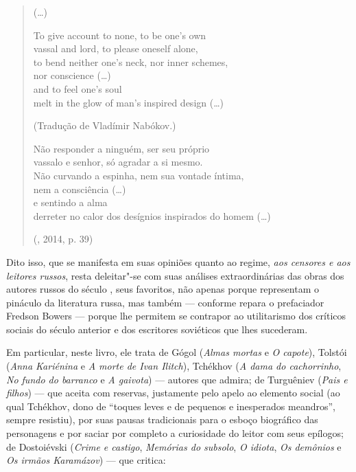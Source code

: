 {\begin{verse}
(\ldots{})

To give account to none, to be one's own \\
vassal and lord, to please oneself alone,\\
to bend neither one's neck, nor inner schemes, \\
nor conscience (\ldots{}) \\
and to feel one's soul \\
melt in the glow of man's inspired design (\ldots{})

(Tradução de Vladímir Nabókov.)

Não responder a ninguém, ser seu próprio \\
vassalo e senhor, só agradar a si mesmo. \\
Não curvando a espinha, nem sua vontade \qb{}íntima, \\
nem a consciência (\ldots{}) \\
e sentindo a alma \\
derreter no calor dos desígnios inspirados \qb{}do homem (\ldots{})

(, 2014, p. 39)
\end{verse}

Dito isso, que se manifesta em suas opiniões quanto ao regime, \emph{aos
censores e aos leitores russos}, resta deleitar"-se com suas análises
extraordinárias das obras dos autores russos do século , seus
favoritos, não apenas porque representam o pináculo da literatura russa,
mas também --- conforme repara o prefaciador Fredson Bowers --- porque
lhe permitem se contrapor ao utilitarismo dos críticos sociais do século
anterior e dos escritores soviéticos que lhes sucederam.

Em particular, neste livro, ele trata de Gógol (\emph{Almas mortas} e
\emph{O capote}), Tolstói (\emph{Anna Kariénina} e \emph{A morte de Ivan
Ilitch}), Tchékhov (\emph{A dama do cachorrinho}, \emph{No fundo do
barranco} e \emph{A gaivota}) --- autores que admira; de Turguêniev
(\emph{Pais e filhos}) --- que aceita com reservas, justamente pelo apelo
ao elemento social (ao qual Tchékhov, dono de ``toques leves e de
pequenos e inesperados meandros'', sempre resistiu), por suas pausas
tradicionais para o esboço biográfico das personagens e por saciar por
completo a curiosidade do leitor com seus epílogos; de Dostoiévski
(\emph{Crime e castigo}, \emph{Memórias do subsolo}, \emph{O idiota},
\emph{Os demônios} e \emph{Os irmãos Karamázov}) --- que critica:

}

